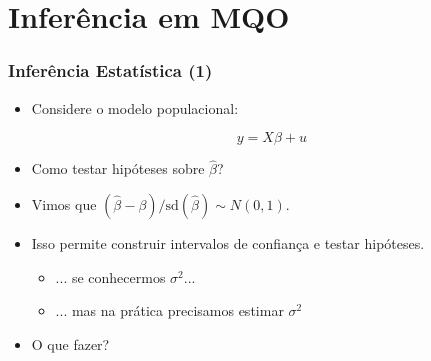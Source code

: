 \documentclass[10pt,slides,xcolor=pdftex,dvipsnames,table]{beamer}
\begin{document}

\section{Inferência em MQO}


\begin{frame}[fragile]
	\frametitle{Inferência Estatística (1)}

\begin{itemize}\itemsep1.2em

\item Considere o modelo populacional:

$$ y = X\beta + u$$ 

\item Como testar hipóteses sobre $\widehat{\beta}$?

\item Vimos que $(\widehat{\beta} - \beta) / \text{sd} (\widehat{\beta}) \sim N(0,1)$. 

\item Isso permite construir intervalos de confiança e testar hipóteses. 
\begin{itemize}
\item ... se conhecermos $\sigma^2$...
\item ... mas na prática precisamos estimar $\sigma^2$ 
\end{itemize}

\item O que fazer?

\end{itemize}

\end{frame}

\end{document}
